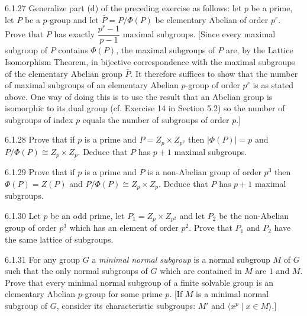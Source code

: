 \begin{exercise}{6.1.27}
    Generalize part (d) of the preceding exercise as follows: let $p$ be a prime, let $P$ be a $p$-group and let $\bar{P} = P/\Phi(P)$ be elementary Abelian of order $p^r$.
    Prove that $P$ has exactly $\dfrac{p^r - 1}{p - 1}$ maximal subgroups.
    [Since every maximal subgroup of $P$ contains $\Phi(P)$, the maximal subgroups of $P$ are, by the Lattice Isomorphism Theorem, in bijective correspondence with the maximal subgroups of the elementary Abelian group $\bar{P}$.
    It therefore suffices to show that the number of maximal subgroups of an elementary Abelian $p$-group of order $p^r$ is as stated above.
    One way of doing this is to use the result that an Abelian group is isomorphic to its dual group (cf. Exercise 14 in Section 5.2) so the number of subgroups of index $p$ equals the number of subgroups of order $p$.]
\end{exercise}

\begin{exercise}{6.1.28}
    Prove that if $p$ is a prime and $P = Z_p \times Z_{p^2}$ then $|\Phi(P)| = p$ and $P/\Phi(P) \cong Z_p \times Z_p$.
    Deduce that $P$ has $p+1$ maximal subgroups.
\end{exercise}

\begin{exercise}{6.1.29}
    Prove that if $p$ is a prime and $P$ is a non-Abelian group of order $p^3$ then $\Phi(P) = Z(P)$ and $P/\Phi(P) \cong Z_p \times Z_p$.
    Deduce that $P$ has $p+1$ maximal subgroups.
\end{exercise}

\begin{exercise}{6.1.30}
    Let $p$ be an odd prime, let $P_1 = Z_p \times Z_{p^2}$ and let $P_2$ be the non-Abelian group of order $p^3$ which has an element of order $p^2$.
    Prove that $P_1$ and $P_2$ have the same lattice of subgroups.
\end{exercise}

\begin{exercise}{6.1.31}
    For any group $G$ a \emph{minimal normal subgroup} is a normal subgroup $M$ of $G$ such that the only normal subgroups of $G$ which are contained in $M$ are $1$ and $M$.
    Prove that every minimal normal subgroup of a finite solvable group is an elementary Abelian $p$-group for some prime $p$.
    [If $M$ is a minimal normal subgroup of $G$, consider its characteristic subgroups: $M'$ and $\langle x^p \mid x \in M \rangle$.]
\end{exercise}

